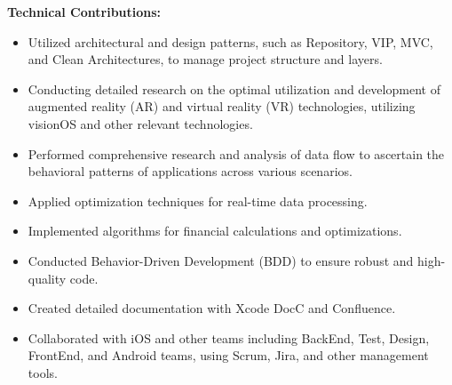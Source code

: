 \documentclass[letter,12pt]{article}
\newcommand{\customsquare}{\raisebox{0.25ex}{\scalebox{0.45}{$\blacksquare$}}}
\begin{document}
\textbf{Technical Contributions:}
\begin{itemize}[label={\customsquare}]
    \item Utilized architectural and design patterns, such as Repository, VIP, MVC, and Clean Architectures, to manage project structure and layers.
    \item Conducting detailed research on the optimal utilization and development of augmented reality (AR) and virtual reality (VR) technologies, utilizing visionOS and other relevant technologies.
    \item Performed comprehensive research and analysis of data flow to ascertain the behavioral patterns of applications across various scenarios.
    \item Applied optimization techniques for real-time data processing.
    \item Implemented algorithms for financial calculations and optimizations.
    \item Conducted Behavior-Driven Development (BDD) to ensure robust and high-quality code.
    \item Created detailed documentation with Xcode DocC and Confluence.
    \item Collaborated with iOS and other teams including BackEnd, Test, Design, FrontEnd, and Android teams, using Scrum, Jira, and other management tools.
\end{itemize}

\pagebreak

\end{document}
